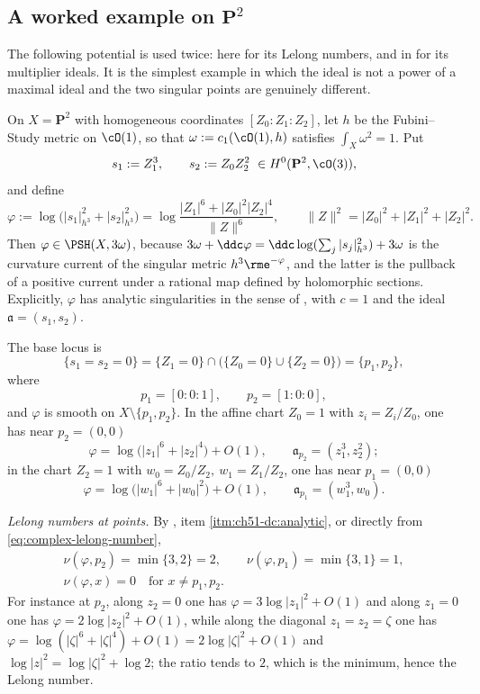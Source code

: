 \subsection{A worked example on \texorpdfstring{\(\mathbf P^2\)}{P2}}
\label{sec:ch51-p2-example}

The following potential is used twice: here for its Lelong numbers, and in
 for its multiplier ideals.  It is the simplest
example in which the ideal is not a power of a maximal ideal and the two
singular points are genuinely different.

\begin{example}
\label{ex:ch51-p2-lelong}
On \(X=\mathbf P^2\) with homogeneous coordinates \([Z_0:Z_1:Z_2]\), let
\(h\) be the Fubini--Study metric on \(\cO(1)\), so that
\(\omega:=c_1(\cO(1),h)\) satisfies \(\int_X\omega^2=1\).  Put
\[
 s_1:=Z_1^3,\qquad s_2:=Z_0Z_2^2\ \in H^0(\mathbf P^2,\cO(3)),
\]
and define
\[
 \varphi:=\log\bigl(|s_1|^2_{h^3}+|s_2|^2_{h^3}\bigr)
 =\log\frac{|Z_1|^6+|Z_0|^2|Z_2|^4}{\|Z\|^6},
 \qquad
 \|Z\|^2=|Z_0|^2+|Z_1|^2+|Z_2|^2 .
\]
Then \(\varphi\in\PSH(X,3\omega)\), because
\(3\omega+\ddc\varphi=\ddc\log(\sum_j|s_j|^2_{h^3})+3\omega\) is the
curvature current of the singular metric \(h^3\rme^{-\varphi}\), and the
latter is the pullback of a positive current under a rational map defined
by holomorphic sections.  Explicitly, \(\varphi\) has analytic
singularities in the sense of ,
with \(c=1\) and the ideal \(\mathfrak a=(s_1,s_2)\).

The base locus is
\[
 \{s_1=s_2=0\}
 =\{Z_1=0\}\cap\bigl(\{Z_0=0\}\cup\{Z_2=0\}\bigr)
 =\{p_1,p_2\},
\]
where
\[
 p_1=[0:0:1],
 \qquad
 p_2=[1:0:0],
\]
and \(\varphi\) is smooth on \(X\setminus\{p_1,p_2\}\).  In the affine
chart \(Z_0=1\) with \(z_i=Z_i/Z_0\), one has near \(p_2=(0,0)\)
\[
 \varphi=\log\bigl(|z_1|^6+|z_2|^4\bigr)+O(1),
 \qquad
 \mathfrak a_{p_2}=(z_1^3,z_2^2);
\]
in the chart \(Z_2=1\) with \(w_0=Z_0/Z_2,\ w_1=Z_1/Z_2\), one has near
\(p_1=(0,0)\)
\[
 \varphi=\log\bigl(|w_1|^6+|w_0|^2\bigr)+O(1),
 \qquad
 \mathfrak a_{p_1}=(w_1^3,w_0).
\]

\emph{Lelong numbers at points.}  By
, item \cref{itm:ch51-dc:analytic}, or
directly from \eqref{eq:complex-lelong-number},
\[
 \begin{gathered}
 \nu(\varphi,p_2)=\min\{3,2\}=2,
 \qquad
 \nu(\varphi,p_1)=\min\{3,1\}=1,\\
 \nu(\varphi,x)=0\quad\text{for }x\neq p_1,p_2 .
 \end{gathered}
\]
For instance at \(p_2\), along \(z_2=0\) one has
\(\varphi=3\log|z_1|^2+O(1)\) and along \(z_1=0\) one has
\(\varphi=2\log|z_2|^2+O(1)\), while along the diagonal
\(z_1=z_2=\zeta\) one has \(\varphi=\log(|\zeta|^6+|\zeta|^4)+O(1)
=2\log|\zeta|^2+O(1)\) and \(\log|z|^2=\log|\zeta|^2+\log2\); the ratio
tends to \(2\), which is the minimum, hence the Lelong number.


\end{example}
